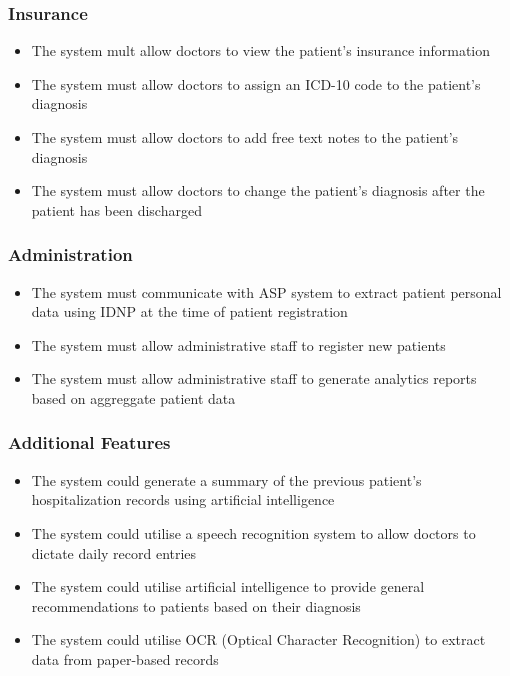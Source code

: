 \subsubsection{Insurance}
\begin{itemize}
    \item The system mult allow doctors to view the patient's insurance information
    \item The system must allow doctors to assign an ICD-10 code to the patient's diagnosis
    \item The system must allow doctors to add free text notes to the patient's diagnosis
    \item The system must allow doctors to change the patient's diagnosis after the patient has been discharged
\end{itemize}

\subsubsection{Administration}

\begin{itemize}
    \item The system must communicate with ASP system to extract patient personal data using IDNP at the time of patient registration
    \item The system must allow administrative staff to register new patients
    \item The system must allow administrative staff to generate analytics reports based on aggreggate patient data
\end{itemize}

\subsubsection{Additional Features}
\begin{itemize}
    \item The system could generate a summary of the previous patient's hospitalization records using artificial intelligence
    \item The system could utilise a speech recognition system to allow doctors to dictate daily record entries
    \item The system could utilise artificial intelligence to provide general recommendations to patients based on their diagnosis
    \item The system could utilise OCR (Optical Character Recognition) to extract data from paper-based records
\end{itemize}

